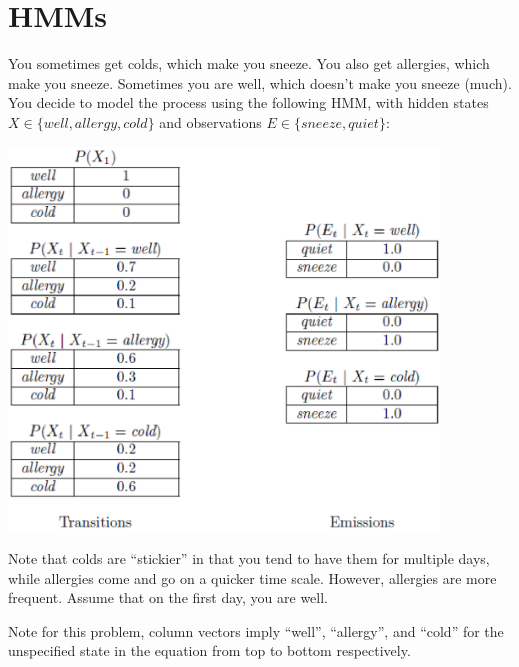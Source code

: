 \documentclass[12pt]{article}
\begin{document}
\clearpage

\section{HMMs}

You sometimes get colds, which make you sneeze. You also get
allergies, which make you sneeze. Sometimes you are well, which
doesn't make you sneeze (much). You decide to model the process using
the following HMM, with hidden states $X \in \{well, allergy, cold\}$ and
observations $E \in \{sneeze, quiet\}$:

\begin{center}
\includegraphics[height=4in]{sneeze.eps}
\end{center}

Note that colds are ``stickier'' in that you tend to have them for
multiple days, while allergies come and go on a quicker time
scale. However, allergies are more frequent. Assume that on the first
day, you are well.

Note for this problem, column vectors imply ``well'', ``allergy'', and ``cold'' for the unspecified state in the equation from top to bottom respectively.
\end{document}
